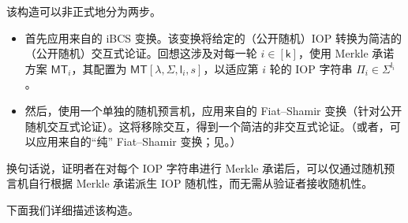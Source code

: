 \documentclass[american,singlepageview]{snargs-book-zh}
\newcommand{\ProtoAlphabet}{\Sigma}
\newcommand{\ProtoRoundComplexity}{\mathsf{k}}
\newcommand{\ProtoProofLength}{\mathsf{l}}
\newcommand{\RoundIndex}{i}
\newcommand{\IOPString}{\Pi}
\newcommand{\IOPRoundComplexity}{\ProtoRoundComplexity}
\newcommand{\IOPAlphabet}{\ProtoAlphabet}
\newcommand{\IOPProofLength}{\ProtoProofLength}
\newcommand{\SecurityParameter}{\lambda}
\newcommand{\PrivacyParameter}{s}
\newcommand{\MTSymbol}{\mathsf{MT}}
\newcommand{\MTConstructor}[4]{\MTSymbol[#1,#2,#3,#4]}
\begin{document}
该构造可以非正式地分为两步。
\begin{itemize}[noitemsep]
  \item 首先应用来自的 iBCS 变换。该变换将给定的（公开随机）IOP 转换为简洁的（公开随机）交互式论证。回想这涉及对每一轮 $\RoundIndex \in [\IOPRoundComplexity]$，使用 Merkle 承诺方案 $\MTSymbol_{\RoundIndex}$，其配置为 $\MTConstructor{\SecurityParameter}{\IOPAlphabet}{\IOPProofLength_{\RoundIndex}}{\PrivacyParameter}$，以适应第 $\RoundIndex$ 轮的 IOP 字符串 $\IOPString_{\RoundIndex} \in \IOPAlphabet^{\IOPProofLength_{\RoundIndex}}$。
  \item 然后，使用一个单独的随机预言机，应用来自的 Fiat--Shamir 变换（针对公开随机交互式论证）。这将移除交互，得到一个简洁的非交互式论证。（或者，可以应用来自的“纯” Fiat--Shamir 变换；见。）
\end{itemize}
换句话说，证明者在对每个 IOP 字符串进行 Merkle 承诺后，可以仅通过随机预言机自行根据 Merkle 承诺派生 IOP 随机性，而无需从验证者接收随机性。

下面我们详细描述该构造。
\end{document}
